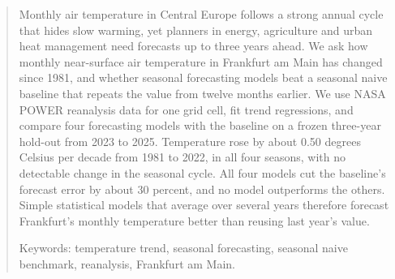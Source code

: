 \begin{abstract}
Monthly air temperature in Central Europe follows a strong annual cycle that hides slow warming, yet planners in energy, agriculture and urban heat management need forecasts up to three years ahead. We ask how monthly near-surface air temperature in Frankfurt am Main has changed since 1981, and whether seasonal forecasting models beat a seasonal naive baseline that repeats the value from twelve months earlier. We use NASA POWER reanalysis data for one grid cell, fit trend regressions, and compare four forecasting models with the baseline on a frozen three-year hold-out from 2023 to 2025. Temperature rose by about 0.50 degrees Celsius per decade from 1981 to 2022, in all four seasons, with no detectable change in the seasonal cycle. All four models cut the baseline's forecast error by about 30 percent, and no model outperforms the others. Simple statistical models that average over several years therefore forecast Frankfurt's monthly temperature better than reusing last year's value.

\medskip
\noindent Keywords: temperature trend, seasonal forecasting, seasonal naive benchmark, reanalysis, Frankfurt am Main.
\end{abstract}
